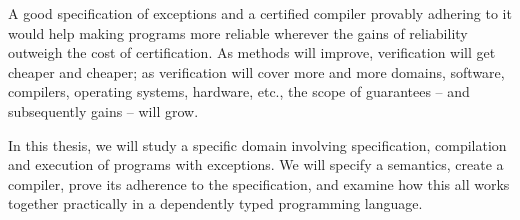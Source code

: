 A good specification of exceptions and a certified compiler provably adhering to it would help
making programs more reliable wherever the gains of reliability outweigh the cost of
certification. As methods will improve, verification will get cheaper and cheaper; as
verification will cover more and more domains, software, compilers, operating systems,
hardware, etc., the scope of guarantees -- and subsequently gains -- will grow.

In this thesis, we will study a specific domain involving specification, compilation
and execution of programs with exceptions. We will specify
a semantics, create a compiler, prove its adherence to the specification, and examine
how this all works together practically in a dependently typed programming language.








































































